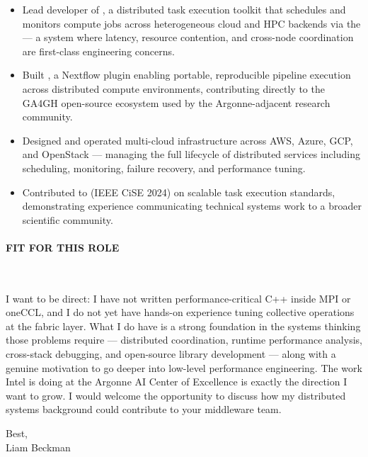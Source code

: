 \begin{itemize}

\item Lead developer of , a distributed task execution toolkit that schedules and monitors compute jobs across heterogeneous cloud and HPC backends via the  --- a system where latency, resource contention, and cross-node coordination are first-class engineering concerns.

\item Built , a Nextflow plugin enabling portable, reproducible pipeline execution across distributed compute environments, contributing directly to the GA4GH open-source ecosystem used by the Argonne-adjacent research community.

\item Designed and operated multi-cloud infrastructure across AWS, Azure, GCP, and OpenStack --- managing the full lifecycle of distributed services including scheduling, monitoring, failure recovery, and performance tuning.

\item Contributed to  (IEEE CiSE 2024) on scalable task execution standards, demonstrating experience communicating technical systems work to a broader scientific community.

\end{itemize}

\paragraph{FIT FOR THIS ROLE}\

\vspace*{\baselineskip}

I want to be direct: I have not written performance-critical C++ inside MPI or oneCCL, and I do not yet have hands-on experience tuning collective operations at the fabric layer. What I do have is a strong foundation in the systems thinking those problems require --- distributed coordination, runtime performance analysis, cross-stack debugging, and open-source library development --- along with a genuine motivation to go deeper into low-level performance engineering. The work Intel is doing at the Argonne AI Center of Excellence is exactly the direction I want to grow. I would welcome the opportunity to discuss how my distributed systems background could contribute to your middleware team.

\vspace*{\baselineskip}

Best,\\

Liam Beckman

\vfill \myBreak{}



